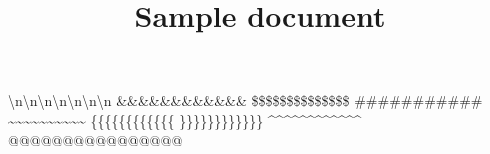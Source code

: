 \documentclass{article}
\title{Sample document}
\begin{document}
\maketitle
\textbackslash n\textbackslash n\textbackslash n\textbackslash n\textbackslash n\textbackslash n\textbackslash n \&\&\&\&\&\&\&\&\&\&\&\& \$\$\$\$\$\$\$\$\$\$\$\$\$\$ \#\#\#\#\#\#\#\#\#\#\# \~{}\~{}\~{}\~{}\~{}\~{}\~{}\~{}\~{}\~{} \{\{\{\{\{\{\{\{\{\{\{\{ \}\}\}\}\}\}\}\}\}\}\}\} \^{}\^{}\^{}\^{}\^{}\^{}\^{}\^{}\^{}\^{}\^{}\^{} @@@@@@@@@@@@@@@@ 
\end{document}
